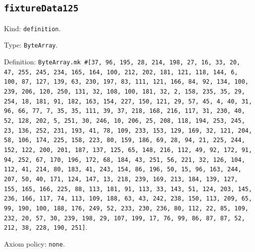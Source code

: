 \documentclass[11pt]{article}
\begin{document}
\subsection*{\texttt{fixtureData125}}
\noindent Kind: \texttt{definition}.\par
\noindent Type: \texttt{ByteArray}.\par
\noindent Definition: \texttt{ByteArray.mk \#[37, 96, 195, 28, 214, 198, 27, 16, 33, 20, 47, 255, 245, 234, 165, 164, 100, 212, 202, 181, 121, 118, 144, 6, 100, 87, 127, 139, 63, 230, 197, 83, 111, 121, 166, 84, 92, 134, 100, 239, 206, 120, 250, 131, 32, 108, 100, 181, 32, 2, 158, 235, 35, 29, 254, 18, 181, 91, 182, 163, 154, 227, 150, 121, 29, 57, 45, 4, 40, 31, 96, 66, 77, 7, 35, 35, 111, 39, 37, 218, 168, 216, 117, 31, 230, 40, 52, 128, 202, 5, 251, 30, 246, 10, 206, 25, 208, 118, 194, 253, 245, 23, 136, 252, 231, 193, 41, 78, 109, 233, 153, 129, 169, 32, 121, 204, 58, 106, 174, 225, 158, 223, 80, 159, 186, 69, 28, 94, 21, 225, 244, 152, 122, 200, 201, 187, 137, 125, 65, 148, 216, 112, 49, 92, 172, 91, 94, 252, 67, 170, 196, 172, 68, 184, 43, 251, 56, 221, 32, 126, 104, 112, 41, 214, 80, 183, 41, 243, 154, 86, 196, 50, 15, 96, 163, 244, 207, 50, 40, 171, 124, 147, 13, 218, 239, 169, 213, 184, 139, 127, 155, 165, 166, 225, 88, 113, 181, 91, 113, 33, 143, 51, 124, 203, 145, 236, 166, 117, 74, 113, 109, 188, 63, 43, 242, 238, 150, 113, 209, 65, 99, 190, 100, 188, 176, 249, 52, 233, 230, 236, 80, 112, 22, 85, 109, 232, 20, 57, 30, 239, 198, 29, 107, 199, 17, 76, 99, 86, 87, 87, 52, 212, 38, 228, 190, 251]}.\par
\noindent Axiom policy: \texttt{none}.\par
\end{document}
